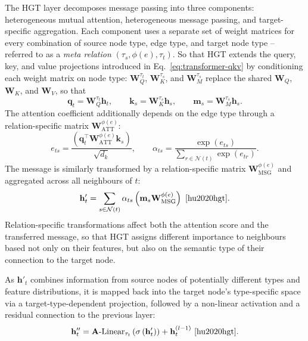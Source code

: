 The HGT layer decomposes message passing
into three components: heterogeneous mutual attention, heterogeneous
message passing, and target-specific aggregation. Each component uses a
separate set of weight matrices for every combination of source node
type, edge type, and target node type -- referred to as a
\emph{meta relation} $(\tau_s, \phi(e), \tau_t)$.
So that HGT extends the query, key, and value projections introduced in
Eq.~\eqref{eq:transformer-qkv} by conditioning each weight matrix on node
type: $\mathbf{W}_{Q}^{\tau_t}$, $\mathbf{W}_{K}^{\tau_s}$, and
$\mathbf{W}_{M}^{\tau_s}$ replace the shared $\mathbf{W}_{Q}$,
$\mathbf{W}_{K}$, and $\mathbf{W}_{V}$, so that
\begin{equation}
\mathbf{q}_t = \mathbf{W}_{Q}^{\tau_t}\mathbf{h}_t, \qquad
\mathbf{k}_s = \mathbf{W}_{K}^{\tau_s}\mathbf{h}_s, \qquad
\mathbf{m}_s = \mathbf{W}_{M}^{\tau_s}\mathbf{h}_s.
\end{equation}
The attention coefficient additionally depends on the edge type through a
relation-specific matrix $\mathbf{W}^{\phi(e)}_{\text{ATT}}$:
\begin{equation}
e_{ts} =
\frac{\left(\mathbf{q}_t^{\top}\mathbf{W}^{\phi(e)}_{\text{ATT}}\mathbf{k}_s\right)}
{\sqrt{d_k}},
\qquad
\alpha_{ts} = \frac{\exp(e_{ts})}{\sum_{r \in \mathcal{N}(t)} \exp(e_{tr})}.
\end{equation}
The message is similarly transformed by a relation-specific matrix
$\mathbf{W}^{\phi(e)}_{\text{MSG}}$ and aggregated across all neighbours
of $t$:
\begin{equation}
\label{eq:hgt-aggregation}
\mathbf{h}'_t =
\sum_{s \in \mathcal{N}(t)}
\alpha_{ts}\left(\mathbf{m}_s\mathbf{W}^{\phi(e)}_{\text{MSG}}\right)~\cite{hu2020hgt}.
\end{equation}
Relation-specific transformations affect both the attention
score and the transferred message, so that HGT assigns different
importance to neighbours based not only on their features, but also on
the semantic type of their connection to the target node.

As $\mathbf{h}'_t$ combines information from source nodes of
potentially different types and feature distributions, it is mapped back
into the target node's type-specific space via a target-type-dependent
projection, followed by a non-linear activation and a residual
connection to the previous layer:
\begin{equation}
\mathbf{h}''_t =
\mathbf{A}\text{-}\mathrm{Linear}_{\tau_t}
\left(\sigma\left(\mathbf{h}'_t\right)\right)
+ \mathbf{h}_t^{(l-1)}~\cite{hu2020hgt}.
\end{equation}

